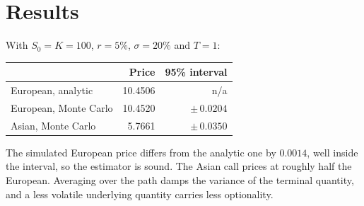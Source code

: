 \documentclass[11pt,a4paper]{article}
\begin{document}
\section{Results}

With $S_0 = K = 100$, $r = 5\%$, $\sigma = 20\%$ and $T = 1$:

\begin{center}
\begin{tabular}{lrr}
\toprule
 & \textbf{Price} & \textbf{95\% interval} \\
\midrule
European, analytic     & 10.4506 & n/a \\
European, Monte Carlo  & 10.4520 & $\pm\,0.0204$ \\
Asian, Monte Carlo     &  5.7661 & $\pm\,0.0350$ \\
\bottomrule
\end{tabular}
\end{center}

The simulated European price differs from the analytic one by $0.0014$, well
inside the interval, so the estimator is sound. The Asian call prices at
roughly half the European. Averaging over the path damps the variance of the
terminal quantity, and a less volatile underlying quantity carries less
optionality.
\end{document}
